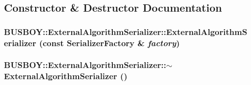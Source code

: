 \subsection{Constructor \& Destructor Documentation}
\hypertarget{classBUSBOY_1_1ExternalAlgorithmSerializer_a3e074df8096623c01b69feadeaefa144}{
\subsubsection[{ExternalAlgorithmSerializer}]{\setlength{\rightskip}{0pt plus 5cm}BUSBOY::ExternalAlgorithmSerializer::ExternalAlgorithmSerializer (const {\bf SerializerFactory} \& {\em factory})}}
\label{classBUSBOY_1_1ExternalAlgorithmSerializer_a3e074df8096623c01b69feadeaefa144}
\hypertarget{classBUSBOY_1_1ExternalAlgorithmSerializer_a8451bfb70e7c6f076208c93a744479e1}{
\subsubsection[{$\sim$ExternalAlgorithmSerializer}]{\setlength{\rightskip}{0pt plus 5cm}BUSBOY::ExternalAlgorithmSerializer::$\sim$ExternalAlgorithmSerializer ()}}
\label{classBUSBOY_1_1ExternalAlgorithmSerializer_a8451bfb70e7c6f076208c93a744479e1}


